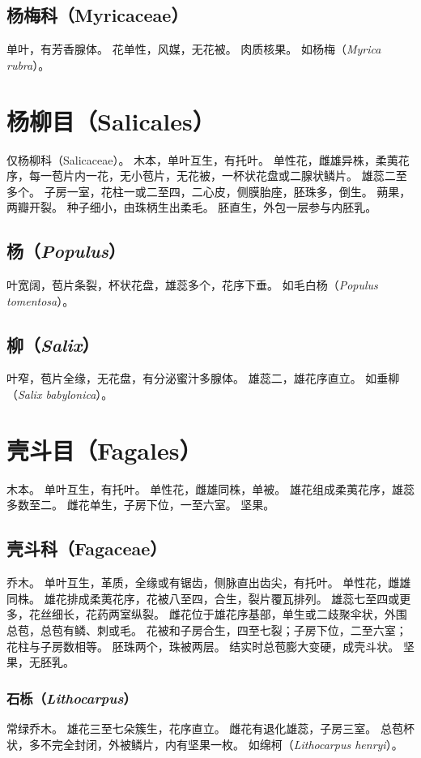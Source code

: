 \documentclass[11pt]{article}
\begin{document}
\begin{sloppypar}
\subsection{杨梅科（Myricaceae）}
单叶，有芳香腺体。
花单性，风媒，无花被。
肉质核果。
如杨梅（\textit{Myrica rubra}）。

\section{杨柳目（Salicales）}
仅杨柳科（Salicaceae）。
木本，单叶互生，有托叶。
单性花，雌雄异株，柔荑花序，每一苞片内一花，无小苞片，无花被，一杯状花盘或二腺状鳞片。
雄蕊二至多个。
子房一室，花柱一或二至四，二心皮，侧膜胎座，胚珠多，倒生。
蒴果，两瓣开裂。
种子细小，由珠柄生出柔毛。
胚直生，外包一层参与内胚乳。

\subsection{杨（\textit{Populus}）}
叶宽阔，苞片条裂，杯状花盘，雄蕊多个，花序下垂。
如毛白杨（\textit{Populus tomentosa}）。

\subsection{柳（\textit{Salix}）}
叶窄，苞片全缘，无花盘，有分泌蜜汁多腺体。
雄蕊二，雄花序直立。
如垂柳（\textit{Salix babylonica}）。

\section{壳斗目（Fagales）}
木本。
单叶互生，有托叶。
单性花，雌雄同株，单被。
雄花组成柔荑花序，雄蕊多数至二。
雌花单生，子房下位，一至六室。
坚果。

\subsection{壳斗科（Fagaceae）}
乔木。
单叶互生，革质，全缘或有锯齿，侧脉直出齿尖，有托叶。
单性花，雌雄同株。
雄花排成柔荑花序，花被八至四，合生，裂片覆瓦排列。
雄蕊七至四或更多，花丝细长，花药两室纵裂。
雌花位于雄花序基部，单生或二歧聚伞状，外围总苞，总苞有鳞、刺或毛。
花被和子房合生，四至七裂；子房下位，二至六室；花柱与子房数相等。
胚珠两个，珠被两层。
结实时总苞膨大变硬，成壳斗状。
坚果，无胚乳。

\subsubsection{石栎（\textit{Lithocarpus}）}
常绿乔木。
雄花三至七朵簇生，花序直立。
雌花有退化雄蕊，子房三室。
总苞杯状，多不完全封闭，外被鳞片，内有坚果一枚。
如绵柯（\textit{Lithocarpus henryi}）。


\end{sloppypar}
\end{document}

